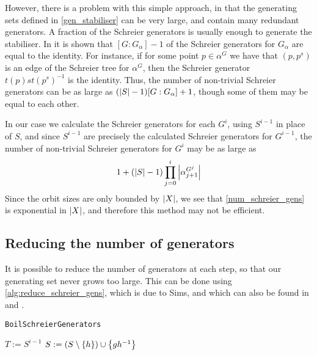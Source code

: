 However, there is a problem with this simple approach, in that the
generating sets defined in \eqref{gen_stabiliser} can be very large,
and contain many redundant generators. A fraction of the Schreier
generators is usually enough to generate the stabiliser. In
\cite{hall59} it is shown that $[G : G_{\alpha}] - 1$ of the Schreier
generators for $G_{\alpha}$ are equal to the identity. For instance,
if for some point $p \in \alpha^G$ we have that $(p, p^s)$ is an edge
of the Schreier tree for $\alpha^G$, then the Schreier generator $t(p)
s t(p^s)^{-1}$ is the identity. Thus, the number of non-trivial
Schreier generators can be as large as $(\left\lvert S \right\rvert - 1) [G : G_{\alpha}]
+ 1$, though some of them may be equal to each other.

In our case we calculate the Schreier generators for each $G^i$, using $S^{i - 1}$ in place of $S$, and since $S^{i - 1}$ are precisely the calculated Schreier generators for $G^{i - 1}$, the number of non-trivial Schreier generators for $G^i$ may be as large as 
\begin{equation} \label{num_schreier_gens}
1 + (\left\lvert S \right\rvert - 1) \prod_{j = 0}^i \left\lvert \alpha_{j + 1}^{G^j} \right\rvert
\end{equation}
Since the orbit sizes are only bounded by $\left\lvert X \right\rvert$, we see that
\eqref{num_schreier_gens} is exponential in $\left\lvert X \right\rvert$, and therefore
this method may not be efficient.

\subsection{Reducing the number of generators}
It is possible to reduce the number of generators at each step, so
that our generating set never grows too large. This can be done using
\ref{alg:reduce_schreier_gens}, which is due to Sims, and which can also be
found in \cite{sims98} and \cite{soicher98}.

\begin{algorithm} 
\dontprintsemicolon
\caption{\texttt{BoilSchreierGenerators}}
\Begin
{
  {
    $T := S^{i - 1}$ \;
    {
      {
        {
          $S := (S \setminus \left\lbrace h \right\rbrace) \cup \left\lbrace g h^{-1} \right\rbrace$ \;
        }
      }
    }    
  }
}
\label{alg:reduce_schreier_gens}
\end{algorithm}

